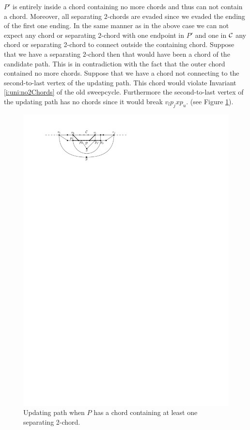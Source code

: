       $P'$ is entirely inside a chord containing no more chords and thus can not contain a chord. Moreover, all separating $2$-chords are evaded since we evaded the ending of the first one ending.  In the same manner as in the above case we can not expect any chord or separating $2$-chord with one endpoint in $P'$ and one in $\mathcal{C}$ any chord or separating 2-chord to connect outside the containing chord.
      Suppose that we have a separating $2$-chord then that would have been a chord of the candidate path. This is in contradiction with the fact that the outer chord contained no more chords.
      Suppose that we have a chord not connecting to the second-to-last vertex of the updating path. This chord would violate Invariant \ref{i:uni:no2Chords} of the old sweepcycle. Furthermore the second-to-last vertex of the updating path has no chords since it would break $v_l p_j x p_u$. (see Figure \ref{fig:sweep:2chordInChordUpdate}).

      \begin{figure}[h]
        \centering
        \includegraphics[scale=1]{unifiedAlgo/img/sweep/2chordInChordUpdate}
        \caption{Updating path when $P$ has a chord containing at least one separating 2-chord.}
        \label{fig:sweep:2chordInChordUpdate}
      \end{figure}

